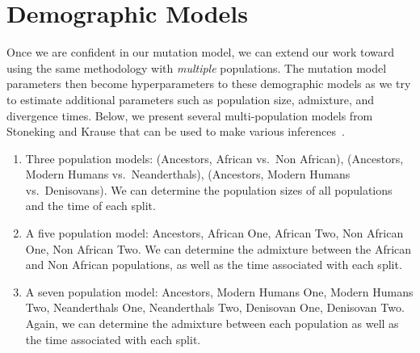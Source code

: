 \section{Demographic Models}\label{sec:demographicModels}
Once we are confident in our mutation model, we can extend our work toward using the same methodology with
\emph{multiple} populations.
The mutation model parameters then become hyperparameters to these demographic models as we try to estimate
additional parameters such as population size, admixture, and divergence times.
Below, we present several multi-population models from Stoneking and Krause that can be used to make various
inferences~\cite{stonekingLearningHumanPopulation2011}.
\begin{enumerate}
    \item Three population models: (Ancestors, African vs.\ Non African), (Ancestors, Modern Humans vs.\ Neanderthals),
        (Ancestors, Modern Humans vs.\ Denisovans).
        We can determine the population sizes of all populations and the time of each split.
    \item A five population model: Ancestors, African One, African Two, Non African One, Non African Two.
        We can determine the admixture between the African and Non African populations, as well as the time associated
        with each split.
    \item A seven population model: Ancestors, Modern Humans One, Modern Humans Two, Neanderthals One, Neanderthals Two,
        Denisovan One, Denisovan Two.
        Again, we can determine the admixture between each population as well as the time associated with each split.
\end{enumerate}
%
